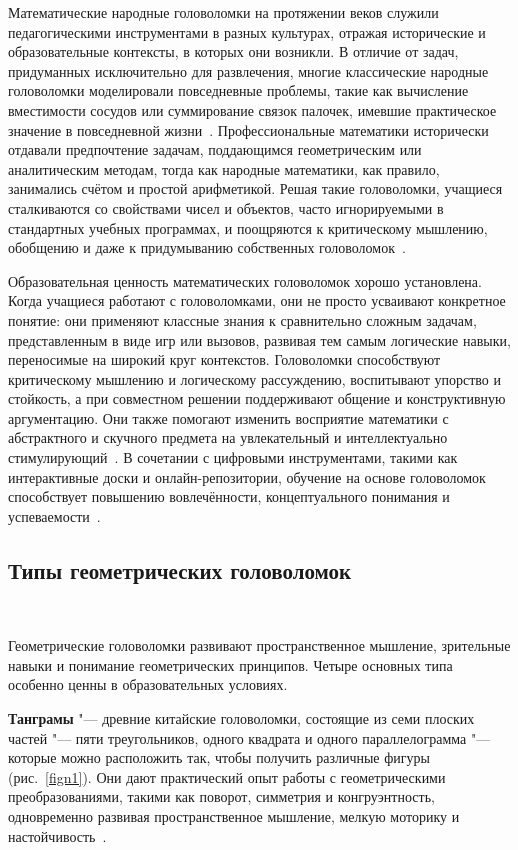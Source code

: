 \documentclass[a4paper,14pt]{extreport}
\theoremstyle{plain}
\theoremstyle{definition}
\theoremstyle{remark}
\begin{document}
Математические народные головоломки на протяжении веков служили педагогическими инструментами в разных культурах, отражая исторические и образовательные контексты, в которых они возникли. В отличие от задач, придуманных исключительно для развлечения, многие классические народные головоломки моделировали повседневные проблемы, такие как вычисление вместимости сосудов или суммирование связок палочек, имевшие практическое значение в повседневной жизни~\cite{Picciotto}. Профессиональные математики исторически отдавали предпочтение задачам, поддающимся геометрическим или аналитическим методам, тогда как народные математики, как правило, занимались счётом и простой арифметикой. Решая такие головоломки, учащиеся сталкиваются со свойствами чисел и объектов, часто игнорируемыми в стандартных учебных программах, и поощряются к критическому мышлению, обобщению и даже к придумыванию собственных головоломок~\cite{Danesi, Iortser}.

Образовательная ценность математических головоломок хорошо установлена. 
Когда учащиеся работают с головоломками, они не просто усваивают конкретное понятие: они применяют классные знания к сравнительно сложным задачам, представленным в виде игр или вызовов, развивая тем самым логические навыки, переносимые на широкий круг контекстов. Головоломки способствуют критическому мышлению и логическому рассуждению, воспитывают упорство и стойкость, а при совместном решении поддерживают общение и конструктивную аргументацию. Они также помогают изменить восприятие математики с абстрактного и скучного предмета на увлекательный и интеллектуально стимулирующий~\cite{Boaler}. 
В сочетании с цифровыми инструментами, такими как интерактивные доски и онлайн-репозитории, обучение на основе головоломок способствует повышению вовлечённости, концептуального понимания и 
успеваемости~\cite{Pramestika, Ahdhianto}.
\subsection{Типы геометрических головоломок}~\label{sec4.1.2}

Геометрические головоломки развивают пространственное мышление, зрительные навыки и понимание геометрических принципов. Четыре основных типа особенно ценны в образовательных условиях.

\textbf{Танграмы} "--- древние китайские головоломки, состоящие из семи плоских частей "--- пяти треугольников, одного квадрата и одного параллелограмма "--- которые можно расположить так, чтобы получить различные фигуры (рис.~\ref{fign1}). Они дают практический опыт работы с геометрическими преобразованиями, такими как поворот, симметрия и конгруэнтность, одновременно развивая пространственное мышление, мелкую моторику и настойчивость~\cite{Boaler}.
\end{document}
